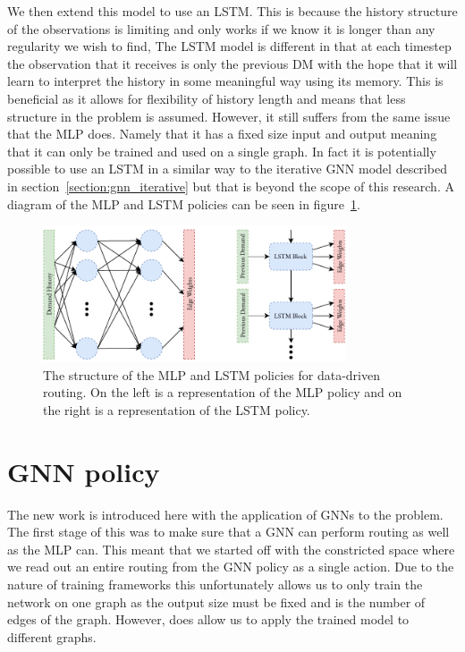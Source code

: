 We then extend this model to use an LSTM\cite{hochreiter1997long}. This is because the history structure of the observations is limiting and only works if we know it is longer than any regularity we wish to find, The LSTM model is different in that at each timestep the observation that it receives is only the previous DM with the hope that it will learn to interpret the history in some meaningful way using its memory. This is beneficial as it allows for flexibility of history length and means that less structure in the problem is assumed. However, it still suffers from the same issue that the MLP does. Namely that it has a fixed size input and output meaning that it can only be trained and used on a single graph. In fact it is potentially possible to use an LSTM in a similar way to the iterative GNN model described in section~\ref{section:gnn_iterative} but that is beyond the scope of this research. A diagram of the MLP and LSTM policies can be seen in figure~\ref{fig:mlp_lstm}.

\begin{figure}
    \centering
    \includegraphics[width=0.8\textwidth]{figures/mlp_lstm.pdf}
    \caption{The structure of the MLP and LSTM policies for data-driven routing. On the left is a representation of the MLP policy and on the right is a representation of the LSTM policy.}
    \label{fig:mlp_lstm}
\end{figure}


\section{GNN policy}
\label{section:gnn_policy}
The new work is introduced here with the application of GNNs to the problem. The first stage of this was to make sure that a GNN can perform routing as well as the MLP can. This meant that we started off with the constricted space where we read out an entire routing from the GNN policy as a single action. Due to the nature of training frameworks this unfortunately allows us to only train the network on one graph as the output size must be fixed and is the number of edges of the graph. However, does allow us to apply the trained model to different graphs.

